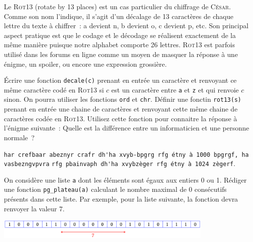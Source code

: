 \documentclass{magnoliaold}
\begin{document}

Le \textsc{Rot13} (rotate by 13 places) est un cas particulier du chiffrage de \textsc{César}.
Comme son nom l'indique, il s'agit d'un décalage de 13 caractères de chaque lettre du texte à
chiffrer~: a devient n, b devient o, c devient p, etc. Son principal aspect pratique est que
le codage et le décodage se réalisent exactement de la même manière puisque notre
alphabet comporte 26 lettres. \textsc{Rot13} est parfois utilisé dans les forums en ligne
comme un moyen de masquer la réponse à une énigme, un spoiler, ou encore une expression
grossière.
\begin{questions}
\question Écrire une fonction \verb!decale(c)! prenant en entrée un caractère et renvoyant
  ce même caractère codé en \textsc{Rot13} si $c$ est un caractère entre \verb!a! et \verb!z!
  et qui renvoie $c$ sinon. On pourra utiliser les fonctions \verb!ord! et \verb!chr!.
\question Définir une fonctin \verb!rot13(s)! prenant en entrée une chaine de caractères et
  renvoyant cette même chaine de caractères codée en \textsc{Rot13}.
\question Utilisez cette fonction pour connaitre la réponse à l'énigme suivante~: Quelle
  est la différence entre un informaticien et une personne normale~?
  \begin{center}
\verb!har crefbaar abeznyr crafr dh'ha xvyb-bpgrg rfg étny à 1000 bpgrgf, ha vasbezngvpvra!
\verb!rfg pbainvaph dh'ha xvybzèger rfg étny à 1024 zègerf!.
  \end{center}
\end{questions}

On considère une liste \verb!a! dont les éléments sont égaux aux entiers 0 ou 1. Rédiger une fonction
\verb!pg_plateau(a)! calculant le nombre maximal de 0 consécutifs présents dans cette liste. Par exemple,
pour la liste suivante, la fonction devra renvoyer la valeur 7.
\begin{center}
\includegraphics[width=0.8\textwidth]{../../commun/images/python-exo-plateau}\\
\end{center}
\end{document}
